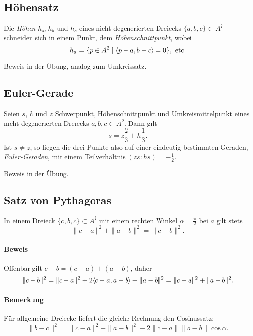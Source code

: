\subsection{Höhensatz}
\begin{Satz}[Höhensatz]
	Die \emph{Höhen} $ h_a,h_b $ und $ h_c $ eines nicht-degenerierten Dreiecks $ \{a,b,c\} \subset A^2 $ schneiden sich in einem Punkt, dem \emph{Höhenschnittpunkt}, wobei
		\[ h_a = \{p\in A^2\mid \langle p-a,b-c \rangle = 0 \},\text{ etc.} \]
\end{Satz}

     	\begin{figure}[ht]\centering
     		
    	\end{figure}


	Beweis in der Übung, analog zum Umkreissatz.

\subsection{Euler-Gerade}
\begin{Satz}
	Seien $ s$, $h$ und $ z $ Schwerpunkt, Höhenschnittpunkt und Umkreismittelpunkt eines nicht-degenerierten Dreiecks $ a,b,c\subset A^2 $.
	Dann gilt
		\[ s=z\frac{2}{3}+h\frac{1}{3}. \]
	Ist $ s\neq z $, so liegen die drei Punkte also auf einer eindeutig bestimmten Geraden, \emph{Euler-Geraden}, mit einem Teilverhältnis $ (zs:hs)=-\frac{1}{2} $.
\end{Satz}
	Beweis in der Übung.

\subsection{Satz von Pythagoras}
\begin{Satz}
	 In einem Dreieck $ \{a,b,c\}\subset A^2 $ mit einem rechten Winkel $ \alpha = \frac{\pi}{2} $ bei $ a $ gilt stets
		 \[ \|c-a\|^2+\|a-b\|^2 = \|c-b\|^2. \]
\end{Satz}
\paragraph{Beweis}
	Offenbar gilt $ c-b = (c-a)+(a-b) $, daher
		\[ \|c-b\|^2 = \|c-a\|^2 + 2\langle c-a,a-b \rangle+\|a-b\|^2 = \|c-a\|^2+\|a-b\|^2. \]
\paragraph{Bemerkung}
	Für allgemeine Dreiecke liefert die gleiche Rechnung den Cosinussatz:
		\[ \|b-c\|^2 = \|c-a\|^2+\|a-b\|^2- 2\|c-a\|\|a-b\|\cos \alpha. \]
